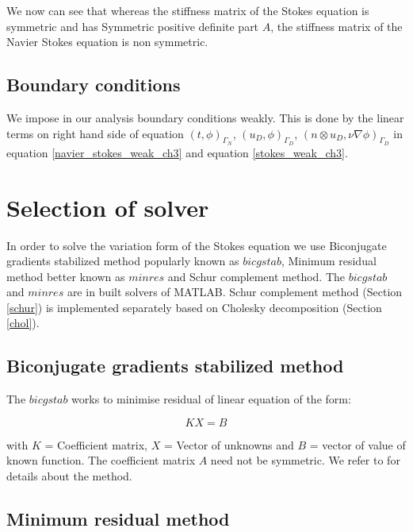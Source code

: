\documentclass[a4paper,openany]{book}
\begin{document}
We now can see that whereas the stiffness matrix of the Stokes equation is symmetric and has Symmetric positive definite part $A$, the stiffness matrix of the Navier Stokes equation is non symmetric.

\subsection{Boundary conditions}

We impose in our analysis boundary conditions weakly. This is done by the linear terms on right hand side of equation  $(t,\phi)_{\Gamma_N}$, $(u_D,\phi)_{\Gamma_D}$, \linebreak $(n \otimes u_D, \nu \nabla \phi)_{\Gamma_D}$ in equation \ref{navier_stokes_weak_ch3} and equation \ref{stokes_weak_ch3}.

\section{Selection of solver}

In order to solve the variation form of the Stokes equation we use Biconjugate gradients stabilized method popularly known as $bicgstab$, Minimum residual method better known as $minres$ and Schur complement method. The $bicgstab$ and $minres$ are in built solvers of MATLAB. Schur complement method (Section \ref{schur}) is implemented separately based on Cholesky decomposition (Section \ref{chol}).

\subsection{Biconjugate gradients stabilized method}

The $bicgstab$ works to minimise residual of linear equation of the form:

\begin{equation} \label{linear_matrix_equation}
KX = B
\end{equation}

with $K$ = Coefficient matrix, $X$ = Vector of unknowns and $B$ = vector of value of known function. The coefficient matrix $A$ need not be symmetric. We refer to \cite{bicgstab} for details about the method.\\

\subsection{Minimum residual method} 
\end{document}
